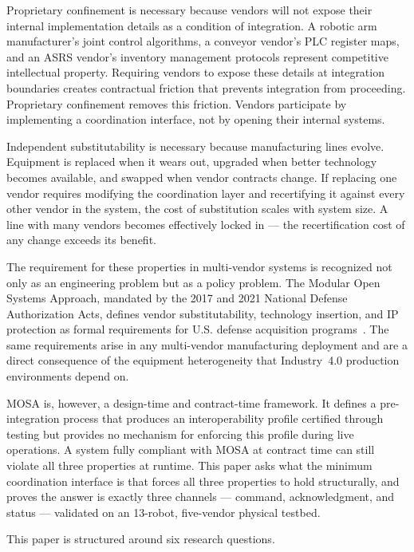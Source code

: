 \documentclass[a4paper,fleqn]{cas-dc}
\begin{document}
Proprietary confinement is necessary because vendors will not expose their internal implementation details as a condition of integration. A robotic arm manufacturer's joint control algorithms, a conveyor vendor's PLC register maps, and an ASRS vendor's inventory management protocols represent competitive intellectual property. Requiring vendors to expose these details at integration boundaries creates contractual friction that prevents integration from proceeding. Proprietary confinement removes this friction. Vendors participate by implementing a coordination interface, not by opening their internal systems.

Independent substitutability is necessary because manufacturing lines evolve. Equipment is replaced when it wears out, upgraded when better technology becomes available, and swapped when vendor contracts change. If replacing one vendor requires modifying the coordination layer and recertifying it against every other vendor in the system, the cost of substitution scales with system size. A line with many vendors becomes effectively locked in — the recertification cost of any change exceeds its benefit.

The requirement for these properties in multi-vendor systems is recognized not only as an engineering problem but as a policy problem. The Modular Open Systems Approach, mandated by the 2017 and 2021 National Defense Authorization Acts, defines vendor substitutability, technology insertion, and IP protection as formal requirements for U.S. defense acquisition programs~\cite{dod2019mosa}. The same requirements arise in any multi-vendor manufacturing deployment and are a direct consequence of the equipment heterogeneity that Industry~4.0 production environments depend on.

MOSA is, however, a design-time and contract-time framework. It defines a pre-integration process that produces an interoperability profile certified through testing but provides no mechanism for enforcing this profile during live operations. A system fully compliant with MOSA at contract time can still violate all three properties at runtime. This paper asks what the minimum coordination interface is that forces all three properties to hold structurally, and proves the answer is exactly three channels — command, acknowledgment, and status — validated on an 13-robot, five-vendor physical testbed.

This paper is structured around six research questions.
\end{document}
